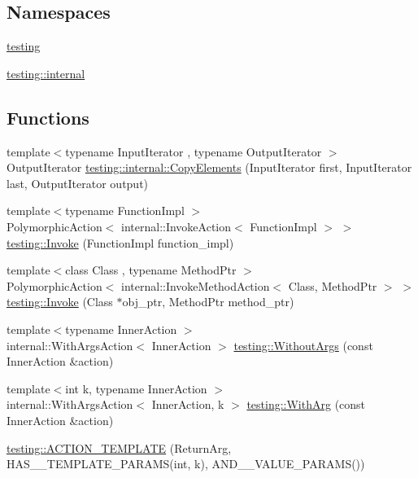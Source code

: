 \subsection*{Namespaces}
\begin{DoxyCompactItemize}
\item 
 \hyperlink{namespacetesting}{testing}
\item 
 \hyperlink{namespacetesting_1_1internal}{testing\+::internal}
\end{DoxyCompactItemize}
\subsection*{Functions}
\begin{DoxyCompactItemize}
\item 
{\footnotesize template$<$typename Input\+Iterator , typename Output\+Iterator $>$ }\\Output\+Iterator \hyperlink{namespacetesting_1_1internal_a9372c12747bcf964aacb1284f8048cae}{testing\+::internal\+::\+Copy\+Elements} (Input\+Iterator first, Input\+Iterator last, Output\+Iterator output)
\item 
{\footnotesize template$<$typename Function\+Impl $>$ }\\Polymorphic\+Action$<$ internal\+::\+Invoke\+Action$<$ Function\+Impl $>$ $>$ \hyperlink{namespacetesting_a12aebaf8363d49a383047529f798b694}{testing\+::\+Invoke} (Function\+Impl function\+\_\+impl)
\item 
{\footnotesize template$<$class Class , typename Method\+Ptr $>$ }\\Polymorphic\+Action$<$ internal\+::\+Invoke\+Method\+Action$<$ Class, Method\+Ptr $>$ $>$ \hyperlink{namespacetesting_a80b82dc382445d240ff011f9c34aefc4}{testing\+::\+Invoke} (Class $\ast$obj\+\_\+ptr, Method\+Ptr method\+\_\+ptr)
\item 
{\footnotesize template$<$typename Inner\+Action $>$ }\\internal\+::\+With\+Args\+Action$<$ Inner\+Action $>$ \hyperlink{namespacetesting_aeac85f74bd11112f69142e92e3a50780}{testing\+::\+Without\+Args} (const Inner\+Action \&action)
\item 
{\footnotesize template$<$int k, typename Inner\+Action $>$ }\\internal\+::\+With\+Args\+Action$<$ Inner\+Action, k $>$ \hyperlink{namespacetesting_af76590c6cecc621e1ab4b681a9ea209b}{testing\+::\+With\+Arg} (const Inner\+Action \&action)
\item 
\hyperlink{namespacetesting_a109d48f969260878ed1e743006196992}{testing\+::\+A\+C\+T\+I\+O\+N\+\_\+\+T\+E\+M\+P\+L\+A\+TE} (Return\+Arg, H\+A\+S\+\_\+\_\+\+T\+E\+M\+P\+L\+A\+T\+E\+\_\+\+P\+A\+R\+A\+MS(int, k), A\+N\+D\+\_\+\_\+\+V\+A\+L\+U\+E\+\_\+\+P\+A\+R\+A\+MS())

\end{DoxyCompactItemize}
